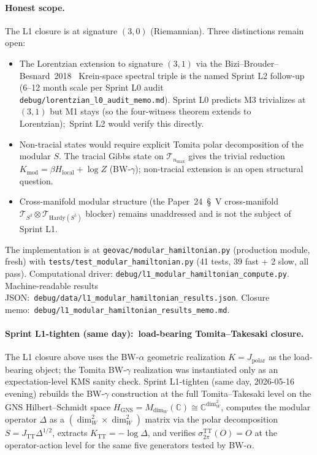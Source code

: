 \documentclass[11pt]{article}
\begin{document}
\paragraph{Honest scope.}
The L1 closure is at signature $(3, 0)$ (Riemannian).  Three
distinctions remain open:

\begin{itemize}
\item The Lorentzian extension to signature $(3, 1)$ via the
Bizi--Brouder--Besnard~2018~\cite{bizi_brouder_besnard2018}
Krein-space spectral triple is the named Sprint L2 follow-up
(6--12 month scale per Sprint L0 audit
\texttt{debug/lorentzian\_l0\_audit\_memo.md}).  Sprint L0 predicts
M3 trivializes at $(3, 1)$ but M1 stays (so the four-witness theorem
extends to Lorentzian);\ Sprint L2 would verify this directly.
\item Non-tracial states would require explicit Tomita polar
decomposition of the modular $S$.  The tracial Gibbs state on
$\mathcal{T}_{n_{\max}}$ gives the trivial reduction
$K_{\mathrm{mod}} = \beta H_{\mathrm{local}} + \log Z$ (BW-$\gamma$);
non-tracial extension is an open structural question.
\item Cross-manifold modular structure (the Paper~24~\S~V cross-manifold
$\mathcal{T}_{S^3} \otimes \mathcal{T}_{\mathrm{Hardy}(S^5)}$ blocker)
remains unaddressed and is not the subject of Sprint L1.
\end{itemize}

The implementation is at
\verb|geovac/modular_hamiltonian.py| (production module, fresh) with
\verb|tests/test_modular_hamiltonian.py| (41 tests, 39 fast + 2 slow,
all pass).  Computational driver:
\verb|debug/l1_modular_hamiltonian_compute.py|.  Machine-readable
results JSON:\
\verb|debug/data/l1_modular_hamiltonian_results.json|.
Closure memo:\ \verb|debug/l1_modular_hamiltonian_results_memo.md|.

\paragraph{Sprint L1-tighten (same day):\ load-bearing Tomita--Takesaki
closure.}
The L1 closure above uses the BW-$\alpha$ geometric realization
$K = J_{\mathrm{polar}}$ as the load-bearing object; the Tomita BW-$\gamma$
realization was instantiated only as an expectation-level KMS sanity
check.  Sprint L1-tighten (same day, 2026-05-16 evening) rebuilds the
BW-$\gamma$ construction at the full Tomita--Takesaki level on the
GNS Hilbert--Schmidt space $H_{\mathrm{GNS}} = M_{\dim_W}(\mathbb{C})
\cong \mathbb{C}^{\dim_W^2}$, computes the modular operator $\Delta$
as a $(\dim_W^2 \times \dim_W^2)$ matrix via the polar decomposition
$S = J_{\mathrm{TT}} \Delta^{1/2}$, extracts $K_{\mathrm{TT}} = -\log
\Delta$, and verifies $\sigma_{2\pi}^{\mathrm{TT}}(O) = O$ at the
operator-action level for the same five generators tested by BW-$\alpha$.
\end{document}
